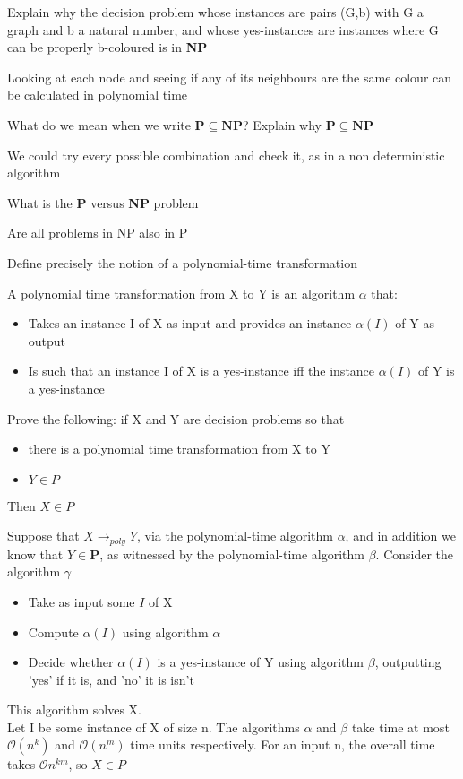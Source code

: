 \documentclass[addpoints]{exam}
\begin{document}
\begin{questions}
\question[3]Explain why the decision problem whose instances are pairs (G,b) with G a graph and b a natural number, and whose yes-instances are instances where G can be properly b-coloured is in \textbf{NP}
\begin{solution}[2in]
	Looking at each node and seeing if any of its neighbours are the same colour can be calculated in polynomial time
\end{solution}

\question[3]What do we mean when we write $\mathbf{P\subseteq NP}$? Explain why $\mathbf{P\subseteq NP}$
\begin{solution}[2in]
	We could try every possible combination and check it, as in a non deterministic algorithm
\end{solution}

\question[2]What is the \textbf{P} versus \textbf{NP} problem
\begin{solution}[2in]
	Are all problems in NP also in P
\end{solution}

\question[4]Define precisely the notion of a polynomial-time transformation
\begin{solution}[2in]
	A polynomial time transformation from X to Y is an algorithm $\alpha$ that:
	\begin{itemize}
		\item Takes an instance I of X as input and provides an instance $\alpha(I)$ of Y as output
		\item Is such that an instance I of X is a yes-instance iff the instance $\alpha(I)$ of Y is a yes-instance
	\end{itemize}
\end{solution}

\question[5] Prove the following: if X and Y are decision problems so that
\begin{itemize}
	\item there is a polynomial time transformation from X to Y
	\item $Y\in P$
\end{itemize}
Then $X\in P$
\begin{solution}[2in]
	Suppose that $X\rightarrow_{poly} Y$, via the polynomial-time algorithm $\alpha$, and in addition we know that $Y\in \mathbf{P}$, as witnessed by the polynomial-time algorithm $\beta$. Consider the algorithm $\gamma$
	\begin{itemize}
		\item Take as input some $I$ of X
		\item Compute $\alpha(I)$ using algorithm $\alpha$
		\item Decide whether $\alpha(I)$ is a yes-instance of Y using algorithm $\beta$, outputting 'yes' if it is, and 'no' it is isn't
	\end{itemize}
	This algorithm solves X.\\
	Let I be some instance of X of size n. The algorithms $\alpha$ and $\beta$ take time at most $\mathcal{O}(n^k)$ and $\mathcal{O}(n^m)$ time units respectively. For an input n, the overall time takes $\mathcal{O}n^{km}$, so $X\in P$
\end{solution}



\end{questions}
\end{document}
